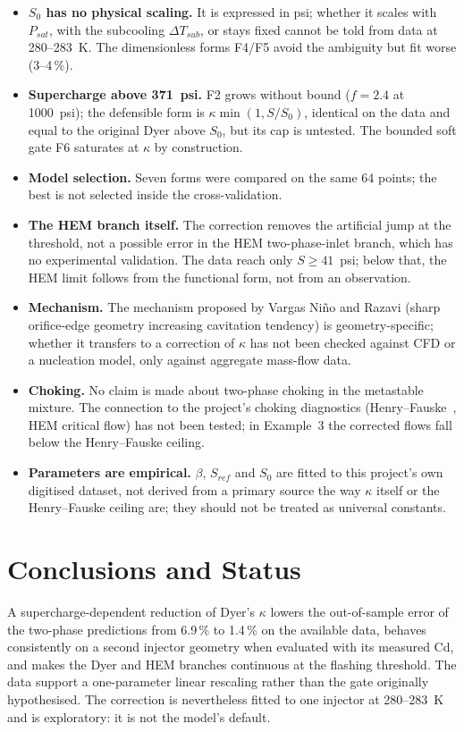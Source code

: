 \documentclass[11pt,a4paper]{article}
\begin{document}
\begin{itemize}
\item \textbf{$S_0$ has no physical scaling.} It is expressed in psi; whether it scales with $P_{sat}$, with the subcooling $\Delta T_{sub}$, or stays fixed cannot be told from data at 280--283~K. The dimensionless forms F4/F5 avoid the ambiguity but fit worse (3--4\,\%).
\item \textbf{Supercharge above 371~psi.} F2 grows without bound ($f=2.4$ at 1000~psi); the defensible form is $\kappa\min(1,S/S_0)$, identical on the data and equal to the original Dyer above $S_0$, but its cap is untested. The bounded soft gate F6 saturates at $\kappa$ by construction.
\item \textbf{Model selection.} Seven forms were compared on the same 64 points; the best is not selected inside the cross-validation.
\item \textbf{The HEM branch itself.} The correction removes the artificial jump at the threshold, not a possible error in the HEM two-phase-inlet branch, which has no experimental validation. The data reach only $S\geq41$~psi; below that, the HEM limit follows from the functional form, not from an observation.
\item \textbf{Mechanism.} The mechanism proposed by Vargas Ni\~no and Razavi (sharp orifice-edge geometry increasing cavitation tendency) is geometry-specific; whether it transfers to a correction of $\kappa$ has not been checked against CFD or a nucleation model, only against aggregate mass-flow data.
\item \textbf{Choking.} No claim is made about two-phase choking in the metastable mixture. The connection to the project's choking diagnostics (Henry--Fauske~\cite{henry1971}, HEM critical flow) has not been tested; in Example~3 the corrected flows fall below the Henry--Fauske ceiling.
\item \textbf{Parameters are empirical.} $\beta$, $S_{ref}$ and $S_0$ are fitted to this project's own digitised dataset, not derived from a primary source the way $\kappa$ itself or the Henry--Fauske ceiling are; they should not be treated as universal constants.
\end{itemize}

\section{Conclusions and Status}\label{sec:status}
A supercharge-dependent reduction of Dyer's $\kappa$ lowers the out-of-sample error of the two-phase predictions from 6.9\,\% to 1.4\,\% on the available data, behaves consistently on a second injector geometry when evaluated with its measured Cd, and makes the Dyer and HEM branches continuous at the flashing threshold. The data support a one-parameter linear rescaling rather than the gate originally hypothesised. The correction is nevertheless fitted to one injector at 280--283~K and is exploratory: it is not the model's default.
\end{document}
